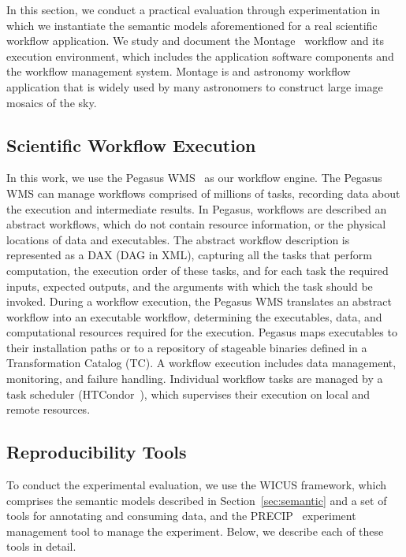 
In this section, we conduct a practical evaluation through experimentation in which we instantiate the semantic models aforementioned for a real scientific workflow application. We study and document the Montage~\cite{Montage} workflow and its execution environment, which includes the application software components and the workflow management system. Montage is and astronomy workflow application that is widely used by many astronomers to construct large image mosaics of the sky.


\subsection{Scientific Workflow Execution}

In this work, we use the Pegasus WMS~\cite{Pegasus, Deelman-FGCS-2014} as our workflow engine. The Pegasus WMS can manage workflows comprised of millions of tasks, recording data about the execution and intermediate results. In Pegasus, workflows are described an abstract workflows, which do not contain resource information, or the physical locations of data and executables. The abstract workflow description is represented as a DAX (DAG in XML), capturing all the tasks that perform computation, the execution order of these tasks, and for each task the required inputs, expected outputs, and the arguments with which the task should be invoked. During a workflow execution, the Pegasus WMS translates an abstract workflow into an executable workflow, determining the executables, data, and computational resources required for the execution.
Pegasus maps executables to their installation paths or to a repository of stageable binaries defined in a Transformation Catalog (TC).
A workflow execution includes data management, monitoring, and failure handling. Individual workflow tasks are managed by a task scheduler (HTCondor~\cite{condor}), which supervises their execution on local and remote resources.


\subsection{Reproducibility Tools}

To conduct the experimental evaluation, we use the WICUS framework, which comprises the semantic models described in Section~\ref{sec:semantic} and a set of tools for annotating and consuming data, and the PRECIP~\cite{Azarnoosh-CRC-2013} experiment management tool to manage the experiment. Below, we describe each of these tools in detail.


